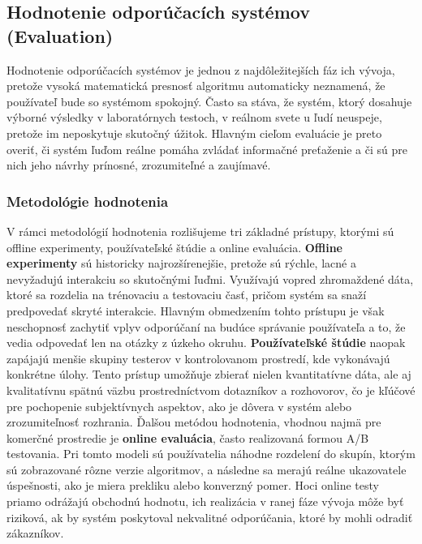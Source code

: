 \subsection{Hodnotenie odporúčacích systémov (Evaluation)}

Hodnotenie odporúčacích systémov je jednou z najdôležitejších fáz ich vývoja, pretože vysoká matematická presnosť algoritmu automaticky neznamená, že používateľ bude so systémom spokojný. Často sa stáva, že systém, ktorý dosahuje výborné výsledky v laboratórnych testoch, v reálnom svete u ľudí neuspeje, pretože im neposkytuje skutočný úžitok. Hlavným cieľom evaluácie je preto overiť, či systém ľuďom reálne pomáha zvládať informačné preťaženie a či sú pre nich jeho návrhy prínosné, zrozumiteľné a zaujímavé.


\subsubsection{Metodológie hodnotenia}

V rámci metodológií hodnotenia rozlišujeme tri základné prístupy, ktorými sú offline experimenty, používateľské štúdie a online evaluácia. \cite{Ricci, Aggarwal}
\textbf{Offline experimenty} sú historicky najrozšírenejšie, pretože sú rýchle, lacné a nevyžadujú interakciu so skutočnými ľuďmi. Využívajú vopred zhromaždené dáta, ktoré sa rozdelia na trénovaciu a testovaciu časť, pričom systém sa snaží predpovedať skryté interakcie. \cite{Ricci} Hlavným obmedzením tohto prístupu je však neschopnosť zachytiť vplyv odporúčaní na budúce správanie používateľa a to, že vedia odpovedať len na otázky z úzkeho okruhu. \cite{Ricci} 
\textbf{Používateľské štúdie} naopak zapájajú menšie skupiny testerov v kontrolovanom prostredí, kde vykonávajú konkrétne úlohy. Tento prístup umožňuje zbierať nielen kvantitatívne dáta, ale aj kvalitatívnu spätnú väzbu prostredníctvom dotazníkov a rozhovorov, čo je kľúčové pre pochopenie subjektívnych aspektov, ako je dôvera v systém alebo zrozumiteľnosť rozhrania. \cite{Ricci}
Ďalšou metódou hodnotenia, vhodnou najmä pre komerčné prostredie je \textbf{online evaluácia}, často realizovaná formou A/B testovania. Pri tomto modeli sú používatelia náhodne rozdelení do skupín, ktorým sú zobrazované rôzne verzie algoritmov, a následne sa merajú reálne ukazovatele úspešnosti, ako je miera prekliku alebo konverzný pomer. \cite{Ricci, Aggarwal} Hoci online testy priamo odrážajú obchodnú hodnotu, ich realizácia v ranej fáze vývoja môže byť riziková, ak by systém poskytoval nekvalitné odporúčania, ktoré by mohli odradiť zákazníkov. \cite{Ricci}

